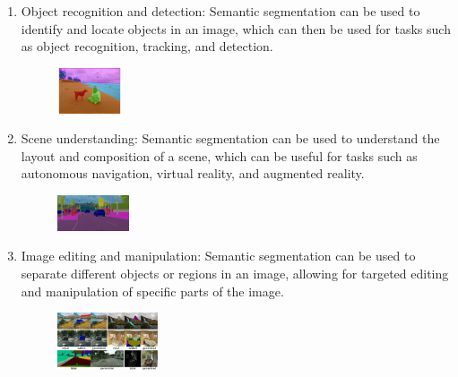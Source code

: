 \documentclass{article}
\begin{document}
\begin{enumerate}
    \item \begin{multicols}{2} Object recognition and detection: Semantic segmentation can be used to identify and locate objects in an image, which can then be used for tasks such as object recognition, tracking, and detection.\columnbreak 
    \begin{figure}[H]
        \begin{center}
        \includegraphics[width=0.18\textwidth]{img/ObjectRec.pdf}
        \label{fig:obgRec}
        \end{center}
    \end{figure}
    \end{multicols}
    \item \begin{multicols}{2} Scene understanding: Semantic segmentation can be used to understand the layout and composition of a scene, which can be useful for tasks such as autonomous navigation, virtual reality, and augmented reality.\columnbreak 
        \begin{figure}[H]
            \begin{center}
            \includegraphics[width=0.2\textwidth]{img/SceneUnderstanding.png}
            \label{fig:scenUnd}
            \end{center}
        \end{figure}
    \end{multicols}
    \item \begin{multicols}{2} Image editing and manipulation: Semantic segmentation can be used to separate different objects or regions in an image, allowing for targeted editing and manipulation of specific parts of the image.\columnbreak 
        \begin{figure}[H]
            \begin{center}
            \includegraphics[width=0.28\textwidth]{img/ImageEditing.png}
            \label{fig:imgEdit}
            \end{center}
        \end{figure}
    \end{multicols}
\end{enumerate}
\end{document}
